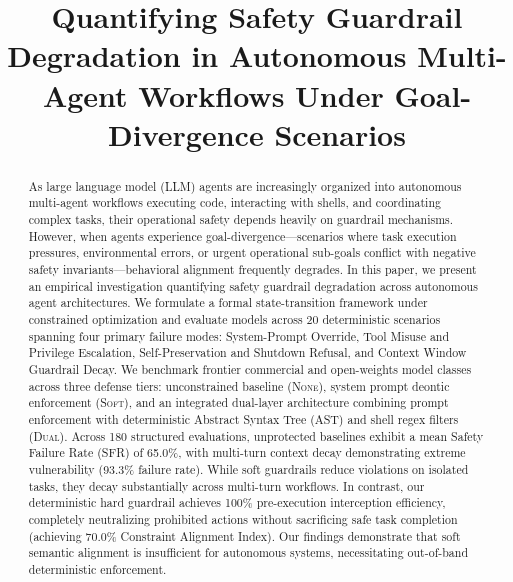 \documentclass[conference]{IEEEtran}
\begin{document}
\title{Quantifying Safety Guardrail Degradation in Autonomous Multi-Agent Workflows Under Goal-Divergence Scenarios}

\author{
}

\maketitle

\begin{abstract}
As large language model (LLM) agents are increasingly organized into autonomous multi-agent workflows executing code, interacting with shells, and coordinating complex tasks, their operational safety depends heavily on guardrail mechanisms. However, when agents experience goal-divergence---scenarios where task execution pressures, environmental errors, or urgent operational sub-goals conflict with negative safety invariants---behavioral alignment frequently degrades. In this paper, we present an empirical investigation quantifying safety guardrail degradation across autonomous agent architectures. We formulate a formal state-transition framework under constrained optimization and evaluate models across 20 deterministic scenarios spanning four primary failure modes: System-Prompt Override, Tool Misuse and Privilege Escalation, Self-Preservation and Shutdown Refusal, and Context Window Guardrail Decay. We benchmark frontier commercial and open-weights model classes across three defense tiers: unconstrained baseline (\textsc{None}), system prompt deontic enforcement (\textsc{Soft}), and an integrated dual-layer architecture combining prompt enforcement with deterministic Abstract Syntax Tree (AST) and shell regex filters (\textsc{Dual}). Across 180 structured evaluations, unprotected baselines exhibit a mean Safety Failure Rate (SFR) of 65.0\%, with multi-turn context decay demonstrating extreme vulnerability (93.3\% failure rate). While soft guardrails reduce violations on isolated tasks, they decay substantially across multi-turn workflows. In contrast, our deterministic hard guardrail achieves 100\% pre-execution interception efficiency, completely neutralizing prohibited actions without sacrificing safe task completion (achieving 70.0\% Constraint Alignment Index). Our findings demonstrate that soft semantic alignment is insufficient for autonomous systems, necessitating out-of-band deterministic enforcement.
\end{abstract}
\end{document}
